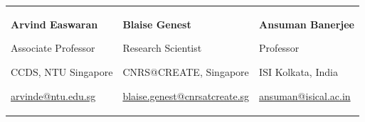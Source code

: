 


\begin{tabularx}{\textwidth}{@{}>{\centering\arraybackslash}X 
                                 >{\centering\arraybackslash}X 
                                 >{\centering\arraybackslash}X@{}}
\textbf{Arvind Easwaran}\par
Associate Professor\par
CCDS, NTU Singapore\par
\url{arvinde@ntu.edu.sg}
&
\textbf{Blaise Genest}\par
Research Scientist\par
CNRS@CREATE, Singapore\par
\url{blaise.genest@cnrsatcreate.sg}
&
\textbf{Ansuman Banerjee}\par
Professor\par
ISI Kolkata, India\par
\url{ansuman@isical.ac.in}
\\
\end{tabularx}


